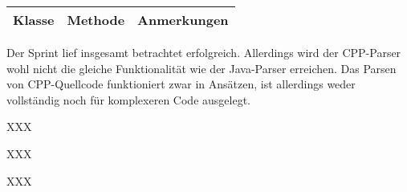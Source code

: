 \begin{table}[H]

\begin{tabularx}{\textwidth}{ |l|l|X| }
\hline
\textbf{Klasse} & \textbf{Methode} & \textbf{Anmerkungen}\\
\hline
\end{tabularx}
\end{table}

\nsecend%

Der Sprint lief insgesamt betrachtet erfolgreich. Allerdings wird der CPP-Parser wohl nicht die gleiche Funktionalität wie der Java-Parser erreichen. Das Parsen von CPP-Quellcode funktioniert zwar in Ansätzen, ist allerdings weder vollständig noch für komplexeren Code ausgelegt.
\nsecend%

XXX
\nsecend%

XXX
\nsecend%

XXX
\nsecend%